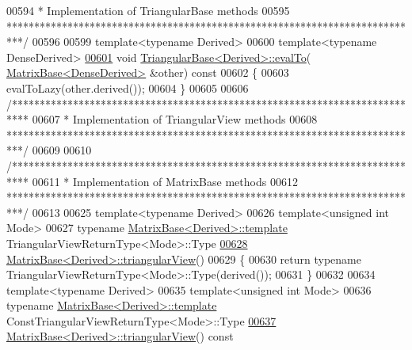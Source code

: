 \begin{DoxyCode}
00594 \textcolor{comment}{* Implementation of TriangularBase methods}
00595 \textcolor{comment}{***************************************************************************/}
00596 
00599 \textcolor{keyword}{template}<\textcolor{keyword}{typename} Derived>
00600 \textcolor{keyword}{template}<\textcolor{keyword}{typename} DenseDerived>
\hyperlink{group___core___module_a604d4f76a376ced36f8b9c3374c76c3e}{00601} \textcolor{keywordtype}{void} \hyperlink{group___core___module_class_eigen_1_1_triangular_base}{TriangularBase<Derived>::evalTo}(
      \hyperlink{group___core___module_class_eigen_1_1_matrix_base}{MatrixBase<DenseDerived>} &other)\textcolor{keyword}{ const}
00602 \textcolor{keyword}{}\{
00603   evalToLazy(other.derived());
00604 \}
00605 
00606 \textcolor{comment}{/***************************************************************************}
00607 \textcolor{comment}{* Implementation of TriangularView methods}
00608 \textcolor{comment}{***************************************************************************/}
00609 
00610 \textcolor{comment}{/***************************************************************************}
00611 \textcolor{comment}{* Implementation of MatrixBase methods}
00612 \textcolor{comment}{***************************************************************************/}
00613 
00625 \textcolor{keyword}{template}<\textcolor{keyword}{typename} Derived>
00626 \textcolor{keyword}{template}<\textcolor{keywordtype}{unsigned} \textcolor{keywordtype}{int} Mode>
00627 \textcolor{keyword}{typename} \hyperlink{group___core___module_class_eigen_1_1_matrix_base}{MatrixBase<Derived>::template} TriangularViewReturnType<Mode>::Type
\hyperlink{group___core___module_a09be7b9dfc5dc6f201f9267f7c1cb950}{00628} \hyperlink{group___core___module_class_eigen_1_1_matrix_base}{MatrixBase<Derived>::triangularView}()
00629 \{
00630   \textcolor{keywordflow}{return} \textcolor{keyword}{typename} TriangularViewReturnType<Mode>::Type(derived());
00631 \}
00632 
00634 \textcolor{keyword}{template}<\textcolor{keyword}{typename} Derived>
00635 \textcolor{keyword}{template}<\textcolor{keywordtype}{unsigned} \textcolor{keywordtype}{int} Mode>
00636 \textcolor{keyword}{typename} \hyperlink{group___core___module_class_eigen_1_1_matrix_base}{MatrixBase<Derived>::template} 
      ConstTriangularViewReturnType<Mode>::Type
\hyperlink{group___core___module_a78f02d00575cce35e9eec4a96ce6674e}{00637} \hyperlink{group___core___module_class_eigen_1_1_matrix_base}{MatrixBase<Derived>::triangularView}()\textcolor{keyword}{ const}

\end{DoxyCode}
